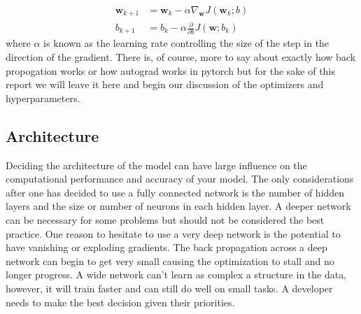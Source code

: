 \documentclass[11pt]{amsart}
\begin{document}
\begin{equation}
\begin{split}
\bm w_{k + 1} &= \bm w_{k} - \alpha \nabla_{\bm w} J(\bm w_{k}; b) \\
b_{k + 1} &= b_{k} - \alpha \frac \partial {\partial b}J(\bm w; b_k)
\label{eq:gd}
\end{split}
\end{equation}
where $\alpha$ is known as the learning rate controlling the size of the step in the direction of the gradient.
There is, of course, more to say about exactly how back propogation works or how autograd works in pytorch but for the sake of this report we will leave it here and begin our discussion of the optimizers and hyperparameters.

\subsection{Architecture}
Deciding the architecture of the model can have large influence on the computational performance and accuracy of your model.
The only considerations after one has decided to use a fully connected network is the number of hidden layers and the size or number of neurons in each hidden layer.
A deeper network can be necessary for some problems but should not be considered the best practice.
One reason to hesitate to use a very deep network is the potential to have vanishing or exploding gradients.
The back propagation across a deep network can begin to get very small causing the optimization to stall and no longer progress.
A wide network can't learn as complex a structure in the data, however, it will train faster and can still do well on small tasks.
A developer needs to make the best decision given their priorities.
\end{document}
